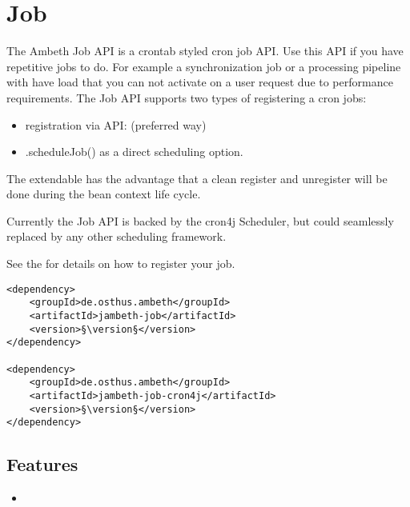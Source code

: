 \section{Job}
\label{module:Job}
\ClearAPI
The Ambeth Job API is a crontab styled cron job API. Use this API if you have repetitive jobs to do. For example a synchronization job or a processing pipeline with have load that you can not activate on a user request due to performance requirements. The Job API supports two types of registering a cron jobs:

\begin{itemize}
	\item registration via  API:  (preferred way)
	\item {}.scheduleJob() as a direct scheduling option.
\end{itemize}

The extendable has the advantage that a clean register and unregister will be done during the bean context life cycle.

Currently the Job API is backed by the cron4j Scheduler, but could seamlessly replaced by any other scheduling framework. 

See the  for details on how to register your job.

\begin{lstlisting}[style=POM,caption={Maven modules to use \emph{Ambeth Job}}]
<dependency>
	<groupId>de.osthus.ambeth</groupId>
	<artifactId>jambeth-job</artifactId>
	<version>§\version§</version>
</dependency>

<dependency>
	<groupId>de.osthus.ambeth</groupId>
	<artifactId>jambeth-job-cron4j</artifactId>
	<version>§\version§</version>
</dependency>
\end{lstlisting}
\subsection{Features}
\begin{itemize}
	\item {}
\end{itemize}

